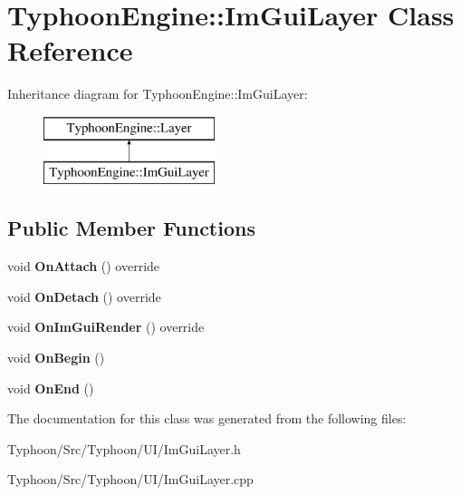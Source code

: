 \hypertarget{class_typhoon_engine_1_1_im_gui_layer}{}\section{Typhoon\+Engine\+::Im\+Gui\+Layer Class Reference}
\label{class_typhoon_engine_1_1_im_gui_layer}
Inheritance diagram for Typhoon\+Engine\+::Im\+Gui\+Layer\+:\begin{figure}[H]
\begin{center}
\leavevmode
\includegraphics[height=2.000000cm]{class_typhoon_engine_1_1_im_gui_layer}
\end{center}
\end{figure}
\subsection*{Public Member Functions}
\begin{DoxyCompactItemize}
\item 
\mbox{\label{class_typhoon_engine_1_1_im_gui_layer_aab9dea81f70f25a94a7d56017185061a}} 
void {\bfseries On\+Attach} () override
\item 
\mbox{\label{class_typhoon_engine_1_1_im_gui_layer_aa5130df0e45b8d87378bf6c168cbc9a3}} 
void {\bfseries On\+Detach} () override
\item 
\mbox{\label{class_typhoon_engine_1_1_im_gui_layer_aa9b746ce6b7e1f56125f4e130c057940}} 
void {\bfseries On\+Im\+Gui\+Render} () override
\item 
\mbox{\label{class_typhoon_engine_1_1_im_gui_layer_ab182bf5bc1e8460c31e71caf1d9e8ac0}} 
void {\bfseries On\+Begin} ()
\item 
\mbox{\label{class_typhoon_engine_1_1_im_gui_layer_a004a3737371e1a599e49345cad375169}} 
void {\bfseries On\+End} ()
\end{DoxyCompactItemize}


The documentation for this class was generated from the following files\+:\begin{DoxyCompactItemize}
\item 
Typhoon/\+Src/\+Typhoon/\+U\+I/Im\+Gui\+Layer.\+h\item 
Typhoon/\+Src/\+Typhoon/\+U\+I/Im\+Gui\+Layer.\+cpp\end{DoxyCompactItemize}
